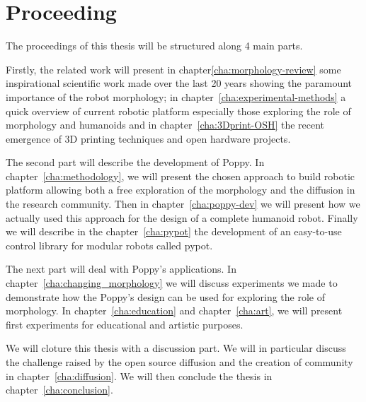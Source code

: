 \section*{Proceeding} %
The proceedings of this thesis will be structured along 4 main parts.

Firstly, the related work will present in chapter\ref{cha:morphology-review} some inspirational scientific work made over the last 20 years showing the paramount importance of the robot morphology; in chapter~\ref{cha:experimental-methods} a quick overview of current robotic platform especially those exploring the role of morphology and humanoids and in chapter~\ref{cha:3Dprint-OSH} the recent emergence of 3D printing techniques and open hardware projects.

The second part will describe the development of Poppy. In chapter~\ref{cha:methodology}, we will present the chosen approach to build robotic platform allowing both a free exploration of the morphology and the diffusion in the research community. Then in chapter~\ref{cha:poppy-dev} we will present how we actually used this approach for the design of a complete humanoid robot. Finally we will describe in the chapter~\ref{cha:pypot} the development of an easy-to-use control library for modular robots called pypot.

The next part will deal with Poppy's applications. In chapter~\ref{cha:changing_morphology} we will discuss experiments we made to demonstrate how the Poppy's design can be used for exploring the role of morphology. In chapter~\ref{cha:education} and chapter~\ref{cha:art}, we will present first experiments for educational and artistic purposes.

We will cloture this thesis with a discussion part. We will in particular discuss the challenge raised by the open source diffusion and the creation of community in chapter~\ref{cha:diffusion}. We will then conclude the thesis in chapter~\ref{cha:conclusion}.

